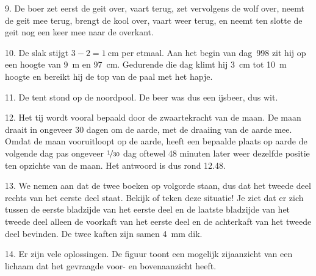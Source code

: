 \begin{problem}{9.}
    De boer zet eerst de geit over, vaart terug, zet vervolgens de wolf over, neemt de geit mee terug, brengt de kool over, vaart weer terug, en neemt ten slotte de geit nog een keer mee naar de overkant.
\end{problem}

\begin{problem}{10.}
    De slak stijgt $3 - 2 = \SI{1}{\cm}$ per etmaal. Aan het begin van dag~998 zit hij op een hoogte van \SI{9}{\metre} en \SI{97}{\cm}. Gedurende die dag klimt hij \SI{3}{\cm} tot \SI{10}{\metre} hoogte en bereikt hij de top van de paal met het hapje.
\end{problem}

\begin{problem}{11.}
    De tent stond op de noordpool. De beer was dus een ijsbeer, dus wit.
\end{problem}

\begin{problem}{12.}
    Het tij wordt vooral bepaald door de zwaartekracht van de maan. De maan draait in ongeveer 30 dagen om de aarde, met de draaiing van de aarde mee. Omdat de maan vooruitloopt op de aarde, heeft een bepaalde plaats op aarde de volgende dag pas ongeveer $\nicefrac{1}{30}$ dag oftewel 48 minuten later weer dezelfde positie ten opzichte van de maan. Het antwoord is dus rond \SI{12.48}{\uur}.
\end{problem}

\begin{problem}{13.}
    We nemen aan dat de twee boeken op volgorde staan, dus dat het tweede deel rechts van het eerste deel staat. Bekijk of teken deze situatie! Je ziet dat er zich tussen de eerste bladzijde van het eerste deel en de laatste bladzijde van het tweede deel alleen de voorkaft van het eerste deel en de achterkaft van het tweede deel bevinden. De twee kaften zijn samen \SI{4}{\mm} dik.
\end{problem}

\clearpage

\begin{problem}{14.}
    Er zijn vele oplossingen. De figuur toont een mogelijk zijaanzicht van een lichaam dat het gevraagde voor- en bovenaanzicht heeft.\\

    \hspace{3cm}
\end{problem}

